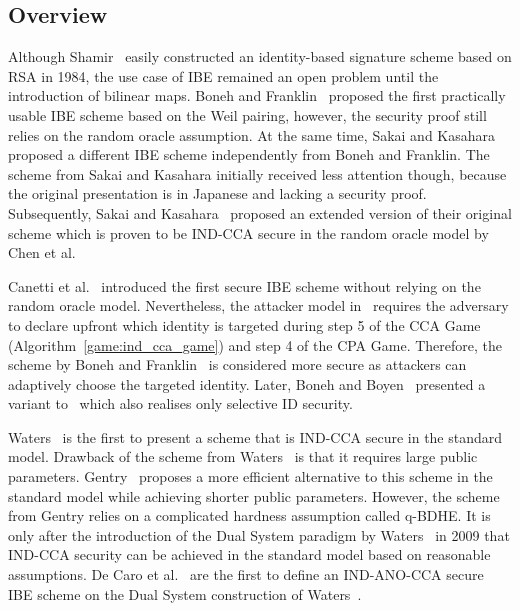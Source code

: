 \subsection{Overview}
\label{sec:evolution_of_ibe}
Although Shamir~\cite{art:Shamir84} easily constructed an identity-based signature scheme based on RSA in 1984, the use case of IBE remained an open problem until the introduction of bilinear maps. Boneh and Franklin~\cite{art:BonehF01} proposed the first practically usable IBE scheme based on the Weil pairing, however, the security proof still relies on the random oracle assumption. At the same time, Sakai and Kasahara~\cite{art:SakaiOK01} proposed a different IBE scheme independently from Boneh and Franklin. The scheme from Sakai and Kasahara initially received less attention though, because the original presentation is in Japanese and lacking a security proof. Subsequently, Sakai and Kasahara~\cite{art:SakaiK03} proposed an extended version of their original scheme which is proven to be IND-CCA secure in the random oracle model by Chen et al.~\cite{art:ChenC05} 

Canetti et al.~\cite{art:CanettiHK03} introduced the first secure IBE scheme without relying on the random oracle model. Nevertheless, the attacker model in~\cite{art:CanettiHK03} requires the adversary to declare upfront which identity \id{} is targeted during step 5 of the CCA Game (Algorithm~\ref{game:ind_cca_game}) and step 4 of the CPA Game. Therefore, the scheme by Boneh and Franklin~\cite{art:BonehF01} is considered more secure as attackers can adaptively choose the targeted identity. Later, Boneh and Boyen~\cite{art:BonehB04} presented a variant to~\cite{art:CanettiHK03} which also realises only selective ID security.

Waters~\cite{art:Waters05} is the first to present a scheme that is IND-CCA secure in the standard model. Drawback of the scheme from Waters~\cite{art:Waters05} is that it requires large public parameters. Gentry~\cite{art:Gentry06} proposes a more efficient alternative to this scheme in the standard model while achieving shorter public parameters. However, the scheme from Gentry relies on a complicated hardness assumption called q-BDHE. It is only after the introduction of the Dual System paradigm by Waters~\cite{art:Waters09} in 2009 that IND-CCA security can be achieved in the standard model based on reasonable assumptions. De Caro et al.~\cite{art:CaroIP10} are the first to define an IND-ANO-CCA secure IBE scheme on the Dual System construction of Waters~\cite{art:Waters09}. %

